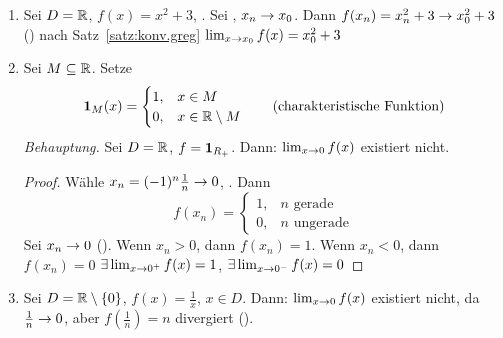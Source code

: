 \documentclass[12pt]{scrreprt}
\begin{document}
\begin{bsp}\label{bsp:fnkt.grenzw-fnkt}
\begin{enumerate}
\item Sei $D = \mathbb{R}$, $f(x) = x^2 +3$, . Sei , $x_n \rightarrow x_0$. Dann $f(x_n) = x_n^2 + 3 \rightarrow x_0^2 + 3$
(\ninf) nach Satz~\ref{satz:konv.greg} \folgt $\lim_{x\rightarrow x_0} f(x) = x_0^2 + 3$
\item Sei $M \subseteq \mathbb{R}$. Setze \[\mathbf{1}_{M}(x) = 
\begin{cases}
1, & x\in M\\
0, & x\in \mathbb{R}\setminus M
\end{cases} \tag{charakteristische Funktion}\]
\emph{Behauptung.} Sei $D=\mathbb{R}$, $f=\mathbf{1}_{R_+}$. Dann: $\lim_{x\rightarrow 0} f(x)$ existiert nicht.
\begin{proof} Wähle $x_n = (-1)^n\frac{1}{n} \rightarrow 0$, \ninf. Dann \[f(x_n) = \begin{cases}
1, &n\text{ gerade}\\
0, &n\text{ ungerade}\end{cases}\]
Sei $x_n\rightarrow 0$ (\ninf). Wenn $x_n > 0$, dann $f(x_n)=1$. Wenn $x_n < 0$, dann $f(x_n)=0$ \folgt 
$\exists\lim_{x\rightarrow 0^+} f(x) = 1$, $\exists\lim_{x\rightarrow 0^-} f(x) = 0$
\end{proof}
\item Sei $D = \mathbb{R}\setminus\{0\}$, $f(x) = \frac{1}{x}$, $x\in D$. Dann: $\lim_{x\rightarrow 0} f(x)$ existiert nicht, 
da $\frac{1}{n} \rightarrow 0$, aber $f(\frac{1}{n}) = n$ divergiert (\ninf).
\end{enumerate}
\end{bsp}
\end{document}
